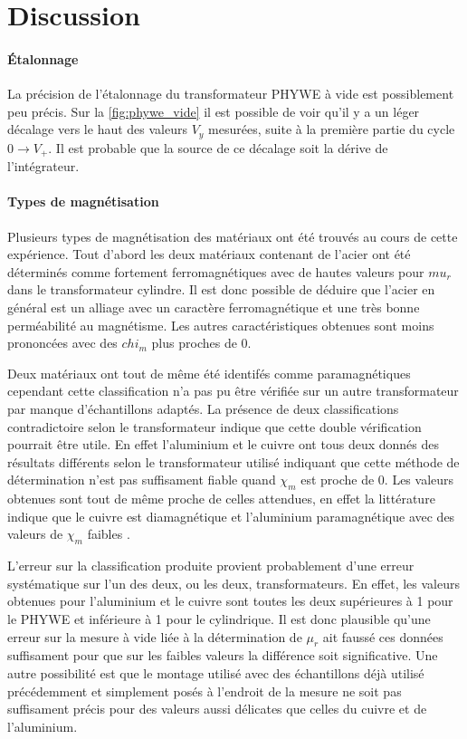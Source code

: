 \section{Discussion}

\paragraph*{Étalonnage}
La précision de l'étalonnage du transformateur PHYWE à vide est possiblement peu précis. Sur la \autoref{fig:phywe_vide} il est possible de voir qu'il y a un léger décalage vers le haut des valeurs \(V_y\) mesurées, suite à la première partie du cycle \(0 \rightarrow V_+\). Il est probable que la source de ce décalage soit la dérive de l'intégrateur.

\paragraph*{Types de magnétisation}
Plusieurs types de magnétisation des matériaux ont été trouvés au cours de cette expérience. Tout d'abord les deux matériaux contenant de l'acier ont été déterminés comme fortement ferromagnétiques avec de hautes valeurs pour \(mu_r\) dans le transformateur cylindre. Il est donc possible de déduire que l'acier en général est un alliage avec un caractère ferromagnétique et une très bonne perméabilité au magnétisme. Les autres caractéristiques obtenues sont moins prononcées avec des \(chi_m\) plus proches de 0. 

Deux matériaux ont tout de même été identifés comme paramagnétiques cependant cette classification n'a pas pu être vérifiée sur un autre transformateur par manque d'échantillons adaptés. La présence de deux classifications contradictoire selon le transformateur indique que cette double vérification pourrait être utile. En effet l'aluminium et le cuivre ont tous deux donnés des résultats différents selon le transformateur utilisé indiquant que cette méthode de détermination n'est pas suffisament fiable quand \(\chi_m\) est proche de 0. Les valeurs obtenues sont tout de même proche de celles attendues, en effet la littérature indique que le cuivre est diamagnétique et l'aluminium paramagnétique avec des valeurs de \(\chi_m\) faibles \cite{classification_litt}. 

L'erreur sur la classification produite provient probablement d'une erreur systématique sur l'un des deux, ou les deux, transformateurs. En effet, les valeurs obtenues pour l'aluminium et le cuivre sont toutes les deux supérieures à 1 pour le PHYWE et inférieure à 1 pour le cylindrique. Il est donc plausible qu'une erreur sur la mesure à vide liée à la détermination de \(\mu_r\) ait faussé ces données suffisament pour que sur les faibles valeurs la différence soit significative. Une autre possibilité est que le montage utilisé avec des échantillons déjà utilisé précédemment et simplement posés à l'endroit de la mesure ne soit pas suffisament précis pour des valeurs aussi délicates que celles du cuivre et de l'aluminium.

